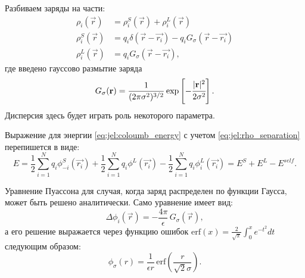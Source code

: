 Разбиваем заряды на части:
\begin{equation}
\label{eq:jel:rho_separation}
\begin{aligned}
    \rho_i (\vec{r}) & = \rho_i^S (\vec{r}) + \rho_i^L (\vec{r}) \\
    \rho_i^S (\vec{r}) & = q_i \delta(\vec{r} - \vec{r_i}) - q_i G_\sigma (\vec{r} - \vec{r_i}) \\
    \rho_i^L (\vec{r}) & = q_i G_\sigma (\vec{r} - \vec{r_i}),
\end{aligned}
\end{equation}
где введено гауссово размытие заряда
\begin{equation}
    \label{eq:jel:gauss_blur}
    G_\sigma (\vec{r}) = \frac{1}{(2\pi \sigma^2)^{3/2}} \exp \left[ - \cfrac{|\vec{r}|^2}{2\sigma^2} \right].
\end{equation}
Дисперсия здесь будет играть роль некоторого параметра.

Выражение для энергии \eqref{eq:jel:coloumb_energy} с учетом \eqref{eq:jel:rho_separation} перепишется в виде:
\begin{equation}
    \label{eq:jel:E_separation}
    E = \frac{1}{2} \sum_{i=1}^N q_i \phi_{-i}^S (\vec{r_i}) + \frac{1}{2} \sum_{i=1}^N q_i \phi^L (\vec{r_i}) - \frac{1}{2} \sum_{i=1}^N q_i \phi_i^L (\vec{r_i})
    = E^S + E^L - E^{self}.
\end{equation}

Уравнение Пуассона для случая, когда заряд распределен по функции Гаусса, может быть решено аналитически. Само уравнение имеет вид:
\begin{equation}
    \label{eq:jel:phi_poisson}
    \Delta \phi_i (\vec{r}) = - \frac{4\pi}{\epsilon}\, G_\sigma (\vec{r}),
\end{equation}
а его решение выражается через функцию ошибок $\mathrm{erf} (x) = \frac{2}{\sqrt{\pi}} \int_0^x e^{-t^2} dt$ следующим образом:
\begin{equation}
    \label{eq:jel:phi_solution}
    \phi_\sigma (r) = \frac{1}{\epsilon r}\, \mathrm{erf} \left( \frac{r}{\sqrt{2}\sigma} \right).
\end{equation}


